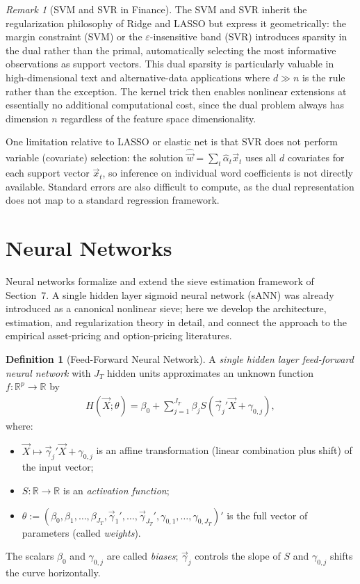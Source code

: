 \documentclass[11pt]{article}
\theoremstyle{definition}
\newtheorem{definition}{Definition}[section]
\theoremstyle{plain}
\theoremstyle{remark}
\newtheorem{remark}{Remark}[section]
\begin{document}
\begin{remark}[SVM and SVR in Finance]
    The SVM and SVR inherit the regularization philosophy of Ridge and LASSO but express it geometrically: the margin constraint (SVM) or the $\varepsilon$-insensitive band (SVR) introduces sparsity in the dual rather than the primal, automatically selecting the most informative observations as support vectors. This dual sparsity is particularly valuable in high-dimensional text and alternative-data applications where $d \gg n$ is the rule rather than the exception. The kernel trick then enables nonlinear extensions at essentially no additional computational cost, since the dual problem always has dimension $n$ regardless of the feature space dimensionality.

    One limitation relative to LASSO or elastic net is that SVR does not perform variable (covariate) selection: the solution $\hat{\vec{w}} = \sum_t \hat{\alpha}_t \vec{x}_t$ uses all $d$ covariates for each support vector $\vec{x}_t$, so inference on individual word coefficients is not directly available. Standard errors are also difficult to compute, as the dual representation does not map to a standard regression framework.
\end{remark}

\section{Neural Networks}

Neural networks formalize and extend the sieve estimation framework of Section~7. A single hidden layer sigmoid neural network (sANN) was already introduced as a canonical nonlinear sieve; here we develop the architecture, estimation, and regularization theory in detail, and connect the approach to the empirical asset-pricing and option-pricing literatures.

\begin{definition}[Feed-Forward Neural Network]
    A \textit{single hidden layer feed-forward neural network} with $J_T$ hidden units approximates an unknown function $f : \mathbb{R}^p \to \mathbb{R}$ by
    \begin{align}
        H(\vec{X};\theta) = \beta_0 + \sum_{j=1}^{J_T} \beta_j S(\vec{\gamma}_j' \vec{X} + \gamma_{0,j}),
    \end{align}
    where:
    \begin{itemize}[noitemsep]
        \item $\vec{X} \mapsto \vec{\gamma}_j'\vec{X} + \gamma_{0,j}$ is an affine transformation (linear combination plus shift) of the input vector;
        \item $S : \mathbb{R} \to \mathbb{R}$ is an \emph{activation function};
        \item $\theta := (\beta_0, \beta_1, \ldots, \beta_{J_T}, \vec{\gamma}_1', \ldots, \vec{\gamma}_{J_T}', \gamma_{0,1}, \ldots, \gamma_{0,J_T})'$ is the full vector of parameters (called \emph{weights}).
    \end{itemize}
    The scalars $\beta_0$ and $\gamma_{0,j}$ are called \emph{biases}; $\vec{\gamma}_j$ controls the slope of $S$ and $\gamma_{0,j}$ shifts the curve horizontally.
\end{definition}
\end{document}
